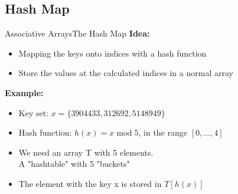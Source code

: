 \subsection{Hash Map}

\begin{frame}{Associative Arrays}{The Hash Map}
  \textbf{Idea:}
  \begin{itemize}
    \item
      Mapping the keys onto indices with a {\color{Mittel-Blau}hash function}
    \item
      Store the values at the calculated indices in a normal array
  \end{itemize}
  \textbf{Example:}
  \begin{itemize}
    \item
      Key set: $x = \{3904433, 312692, 5148949\}$
     \item
      Hash function:
      {\color{Mittel-Blau}$h(x) = x \;\mathrm{mod}\; 5$}, in the range {\color{Mittel-Blau} $[0, \ldots, 4]$ }
     \item We need an array {\color{Mittel-Blau}T} with {\color{Mittel-Blau}5} elements.\\
          A "hashtable" with 5 "buckets"
     \item The element with the key {\color{Mittel-Blau}x} is stored in {\color{Mittel-Blau}$T[h(x)]$} 
  \end{itemize}
\end{frame}



